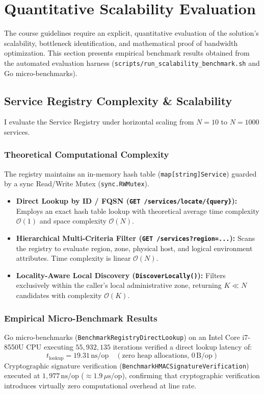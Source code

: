 \section{Quantitative Scalability Evaluation}
\label{sec:evaluation}

The course guidelines require an explicit, quantitative evaluation of the solution's scalability, bottleneck identification, and mathematical proof of bandwidth optimization. This section presents empirical benchmark results obtained from the automated evaluation harness (\texttt{scripts/run\_scalability\_benchmark.sh} and Go micro-benchmarks).

\subsection{Service Registry Complexity \& Scalability}
I evaluate the Service Registry under horizontal scaling from $N = 10$ to $N = 1000$ services.

\subsubsection{Theoretical Computational Complexity}
The registry maintains an in-memory hash table (\texttt{map[string]Service}) guarded by a sync Read/Write Mutex (\texttt{sync.RWMutex}).
\begin{itemize}
    \item \textbf{Direct Lookup by ID / FQSN (\texttt{GET /services/locate/\{query\}}):} Employs an exact hash table lookup with theoretical average time complexity $\mathcal{O}(1)$ and space complexity $\mathcal{O}(N)$.
    \item \textbf{Hierarchical Multi-Criteria Filter (\texttt{GET /services?region=...}):} Scans the registry to evaluate region, zone, physical host, and logical environment attributes. Time complexity is linear $\mathcal{O}(N)$.
    \item \textbf{Locality-Aware Local Discovery (\texttt{DiscoverLocally()}):} Filters exclusively within the caller's local administrative zone, returning $K \ll N$ candidates with complexity $\mathcal{O}(K)$.
\end{itemize}

\subsubsection{Empirical Micro-Benchmark Results}
Go micro-benchmarks (\texttt{BenchmarkRegistryDirectLookup}) on an Intel Core i7-8550U CPU executing $55{,}932{,}135$ iterations verified a direct lookup latency of:
\begin{equation}
    t_{\text{lookup}} = 19.31\,\text{ns/op} \quad (\text{zero heap allocations, } 0\,\text{B/op})
\end{equation}
Cryptographic signature verification (\texttt{BenchmarkHMACSignatureVerification}) executed at $1{,}977\,\text{ns/op}$ ($\approx 1.9\,\mu\text{s/op}$), confirming that cryptographic verification introduces virtually zero computational overhead at line rate.

